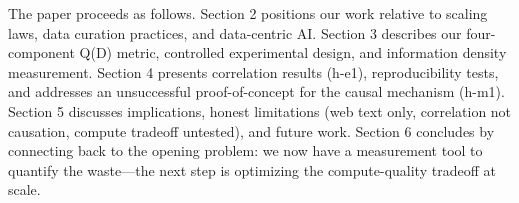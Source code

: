 The paper proceeds as follows. Section 2 positions our work relative to scaling laws, data curation practices, and data-centric AI. Section 3 describes our four-component Q(D) metric, controlled experimental design, and information density measurement. Section 4 presents correlation results (h-e1), reproducibility tests, and addresses an unsuccessful proof-of-concept for the causal mechanism (h-m1). Section 5 discusses implications, honest limitations (web text only, correlation not causation, compute tradeoff untested), and future work. Section 6 concludes by connecting back to the opening problem: we now have a measurement tool to quantify the waste---the next step is optimizing the compute-quality tradeoff at scale.
